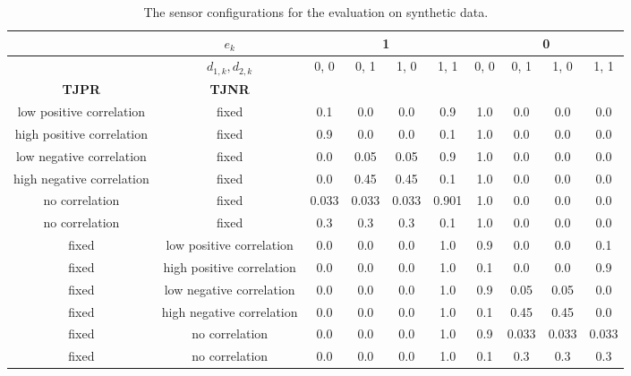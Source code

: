 \begin{table}
\begin{center}
 \begin{tabular}{| c | c || c | c | c | c || c | c | c | c|} 
 \hline
     & $e_k$ &  \multicolumn{4}{|c||}{1} &  \multicolumn{4}{c|}{0} \\
 \hline
 & $d_{1,k}, d_{2,k}$  & 0, 0 & 0, 1 & 1, 0 & 1, 1 & 0, 0 & 0, 1 & 1, 0  & 1, 1\\  
 \hline\hline
 \textbf{TJPR} & \textbf{TJNR} &  &  &  &  &  &  &  & \\  
 \hline
 \hline
 low positive correlation & fixed & 0.1 & 0.0 & 0.0 & 0.9 & 1.0 & 0.0 & 0.0 & 0.0\\  
 \hline
 high positive correlation & fixed & 0.9 & 0.0 & 0.0 & 0.1 & 1.0 & 0.0 & 0.0 & 0.0\\  
 \hline
 low negative correlation & fixed & 0.0 & 0.05 & 0.05 & 0.9 & 1.0 & 0.0 & 0.0 & 0.0\\  
 \hline
 high negative correlation & fixed & 0.0 & 0.45 & 0.45 & 0.1 & 1.0 & 0.0 & 0.0 & 0.0\\  
 \hline
 no correlation & fixed & 0.033 & 0.033 & 0.033 & 0.901 & 1.0 & 0.0 & 0.0 & 0.0\\  
 \hline
 no correlation & fixed & 0.3 & 0.3 & 0.3 & 0.1 & 1.0 & 0.0 & 0.0 & 0.0\\  
 \hline
 fixed & low positive correlation  & 0.0 & 0.0 & 0.0 & 1.0 & 0.9 & 0.0 & 0.0 & 0.1\\  
 \hline
 fixed & high positive correlation  & 0.0 & 0.0 & 0.0 & 1.0 & 0.1 & 0.0 & 0.0 & 0.9\\  
 \hline
 fixed & low negative correlation  & 0.0 & 0.0 & 0.0 & 1.0 & 0.9 & 0.05 & 0.05 & 0.0\\  
 \hline
 fixed & high negative correlation  & 0.0 & 0.0 & 0.0 & 1.0 & 0.1 & 0.45 & 0.45 & 0.0\\  
 \hline
 fixed & no correlation  & 0.0 & 0.0 & 0.0 & 1.0 & 0.9 & 0.033 & 0.033 & 0.033\\  
 \hline
 fixed & no correlation  & 0.0 & 0.0 & 0.0 & 1.0 & 0.1 & 0.3 & 0.3 & 0.3\\  
 \hline
\end{tabular}
\end{center}
\caption{The sensor configurations for the evaluation on synthetic data.}
\label{tab:eval_sim}
\end{table}


